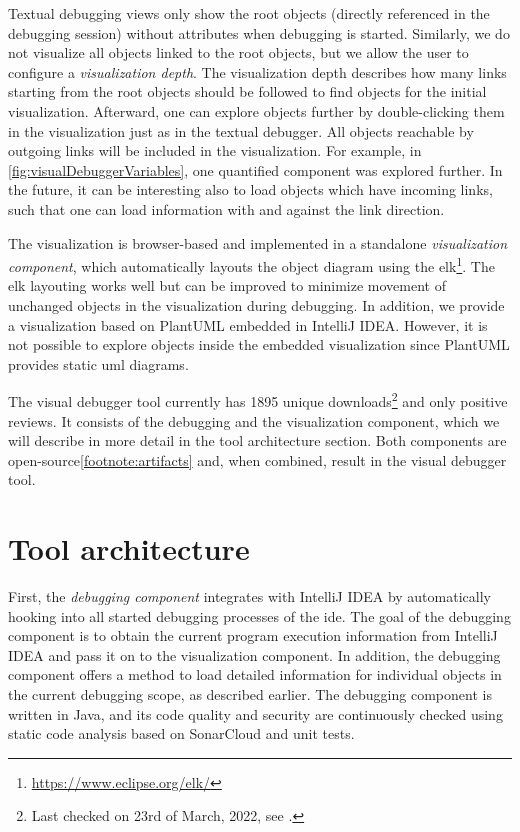 \documentclass[conference]{IEEEtran}
\newcommand{\intellij}{IntelliJ IDEA}
\begin{document}
Textual debugging views only show the root objects (directly referenced in the debugging session) without attributes when debugging is started.
Similarly, we do not visualize all objects linked to the root objects, but we allow the user to configure a \textit{visualization depth}.
The visualization depth describes how many links starting from the root objects should be followed to find objects for the initial visualization.
Afterward, one can explore objects further by double-clicking them in the visualization just as in the textual debugger.
All objects reachable by outgoing links will be included in the visualization.
For example, in \cref{fig:visualDebuggerVariables}, one quantified component was explored further.
In the future, it can be interesting also to load objects which have incoming links, such that one can load information with and against the link direction.

The visualization is browser-based and implemented in a standalone \textit{visualization component}, which automatically layouts the object diagram using the \gls*{elk}\footnote{\url{https://www.eclipse.org/elk/}}.
The \gls*{elk} layouting works well but can be improved to minimize movement of unchanged objects in the visualization during debugging.
In addition, we provide a visualization based on PlantUML embedded in \intellij{}.
However, it is not possible to explore objects inside the embedded visualization since PlantUML provides static \gls*{uml} diagrams.

The visual debugger tool currently has 1895 unique downloads\footnote{\label{footnote:pluginStats}Last checked on 23rd of March, 2022, see \cite{VisualDebuggerIntelliJ}.} and only positive reviews.
It consists of the debugging and the visualization component, which we will describe in more detail in the tool architecture section.
Both components are open-source\cref{footnote:artifacts} and, when combined, result in the visual debugger tool.

\section{Tool architecture}  \label{sec:architecture}
First, the \textit{debugging component} integrates with \intellij{} by automatically hooking into all started debugging processes of the \gls*{ide}.
The goal of the debugging component is to obtain the current program execution information from \intellij{} and pass it on to the visualization component.
In addition, the debugging component offers a method to load detailed information for individual objects in the current debugging scope, as described earlier.
The debugging component is written in Java, and its code quality and security are continuously checked using static code analysis based on SonarCloud and unit tests.
\end{document}
